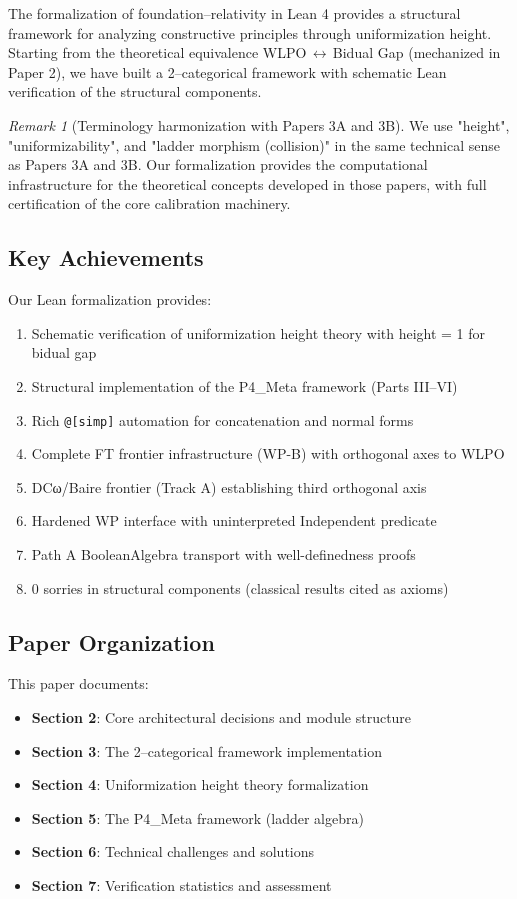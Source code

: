 \documentclass[11pt]{article}
\theoremstyle{definition}
\theoremstyle{remark}
\newtheorem{remark}[theorem]{Remark}
\begin{document}
The formalization of foundation--relativity in Lean 4 provides a structural framework for analyzing constructive principles through uniformization height. Starting from the theoretical equivalence WLPO\,$\leftrightarrow$\,Bidual Gap (mechanized in Paper 2), we have built a 2--categorical framework with schematic Lean verification of the structural components.

\begin{remark}[Terminology harmonization with Papers 3A and 3B]
We use "height", "uniformizability", and "ladder morphism (collision)" in the same technical sense as Papers 3A and 3B.
Our formalization provides the computational infrastructure for the theoretical concepts developed in those papers,
with full certification of the core calibration machinery.
\end{remark}

\subsection{Key Achievements}

Our Lean formalization provides:
\begin{enumerate}
\item Schematic verification of uniformization height theory with height = 1 for bidual gap
\item Structural implementation of the P4\_Meta framework (Parts III--VI)
\item Rich \texttt{@[simp]} automation for concatenation and normal forms
\item Complete FT frontier infrastructure (WP-B) with orthogonal axes to WLPO
\item DCω/Baire frontier (Track A) establishing third orthogonal axis
\item Hardened WP interface with uninterpreted Independent predicate
\item Path A BooleanAlgebra transport with well-definedness proofs
\item 0 sorries in structural components (classical results cited as axioms)
\end{enumerate}

\subsection{Paper Organization}

This paper documents:
\begin{itemize}
\item \textbf{Section 2}: Core architectural decisions and module structure
\item \textbf{Section 3}: The 2--categorical framework implementation
\item \textbf{Section 4}: Uniformization height theory formalization
\item \textbf{Section 5}: The P4\_Meta framework (ladder algebra)
\item \textbf{Section 6}: Technical challenges and solutions
\item \textbf{Section 7}: Verification statistics and assessment
\end{itemize}
\end{document}
